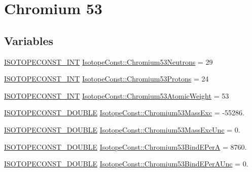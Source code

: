 \hypertarget{group___isotope_const-_chromium-_cr53}{}\section{Chromium 53}
\label{group___isotope_const-_chromium-_cr53}
\subsection*{Variables}
\begin{DoxyCompactItemize}
\item 
\mbox{\hyperlink{group___isotope_const-_macros_ga5f18360b3e99483a35c32d789e62621c}{I\+S\+O\+T\+O\+P\+E\+C\+O\+N\+S\+T\+\_\+\+I\+NT}} \mbox{\hyperlink{group___isotope_const-_chromium-_cr53_ga856cf165afb3962884b4f499f371e94d}{Isotope\+Const\+::\+Chromium53\+Neutrons}} = 29
\item 
\mbox{\hyperlink{group___isotope_const-_macros_ga5f18360b3e99483a35c32d789e62621c}{I\+S\+O\+T\+O\+P\+E\+C\+O\+N\+S\+T\+\_\+\+I\+NT}} \mbox{\hyperlink{group___isotope_const-_chromium-_cr53_ga22cd0cb1cf83f5e95bc72cafabfe1cd0}{Isotope\+Const\+::\+Chromium53\+Protons}} = 24
\item 
\mbox{\hyperlink{group___isotope_const-_macros_ga5f18360b3e99483a35c32d789e62621c}{I\+S\+O\+T\+O\+P\+E\+C\+O\+N\+S\+T\+\_\+\+I\+NT}} \mbox{\hyperlink{group___isotope_const-_chromium-_cr53_ga42fe3beb4c80b21a366d0bea863e55e3}{Isotope\+Const\+::\+Chromium53\+Atomic\+Weight}} = 53
\item 
\mbox{\hyperlink{group___isotope_const-_macros_ga8f45a7272ce02c0b4c65c44636ed719a}{I\+S\+O\+T\+O\+P\+E\+C\+O\+N\+S\+T\+\_\+\+D\+O\+U\+B\+LE}} \mbox{\hyperlink{group___isotope_const-_chromium-_cr53_ga295ec45c7b285f0c7723091ba4678bd5}{Isotope\+Const\+::\+Chromium53\+Mass\+Exc}} = -\/55286.
\item 
\mbox{\hyperlink{group___isotope_const-_macros_ga8f45a7272ce02c0b4c65c44636ed719a}{I\+S\+O\+T\+O\+P\+E\+C\+O\+N\+S\+T\+\_\+\+D\+O\+U\+B\+LE}} \mbox{\hyperlink{group___isotope_const-_chromium-_cr53_ga0754da39c3714e209d33061dd97eab37}{Isotope\+Const\+::\+Chromium53\+Mass\+Exc\+Unc}} = 0.
\item 
\mbox{\hyperlink{group___isotope_const-_macros_ga8f45a7272ce02c0b4c65c44636ed719a}{I\+S\+O\+T\+O\+P\+E\+C\+O\+N\+S\+T\+\_\+\+D\+O\+U\+B\+LE}} \mbox{\hyperlink{group___isotope_const-_chromium-_cr53_gac24345711de08ad63e0f74be8ebb026a}{Isotope\+Const\+::\+Chromium53\+Bind\+E\+PerA}} = 8760.
\item 
\mbox{\hyperlink{group___isotope_const-_macros_ga8f45a7272ce02c0b4c65c44636ed719a}{I\+S\+O\+T\+O\+P\+E\+C\+O\+N\+S\+T\+\_\+\+D\+O\+U\+B\+LE}} \mbox{\hyperlink{group___isotope_const-_chromium-_cr53_ga1e83b5d9eee628d2c7a6693fa1c1e4cd}{Isotope\+Const\+::\+Chromium53\+Bind\+E\+Per\+A\+Unc}} = 0.

\end{DoxyCompactItemize}
